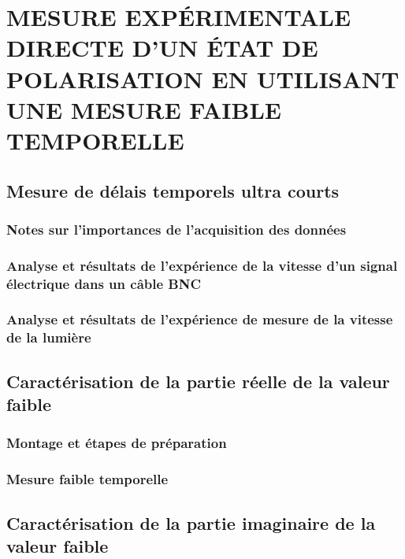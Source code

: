 \documentclass[superscriptaddress,12pt]{article}
\begin{document}
    \thispagestyle{empty}
    \section{MESURE EXPÉRIMENTALE DIRECTE D'UN ÉTAT DE POLARISATION EN UTILISANT UNE MESURE FAIBLE TEMPORELLE}\label{chap:3}
    
    \subsection{Mesure de délais temporels ultra courts}
    
    \subsubsection{Notes sur l'importances de l’acquisition des données	}
    
    \subsubsection{Analyse et résultats de l'expérience de la vitesse d'un signal électrique dans un câble BNC}
    
    \subsubsection{Analyse et résultats de l'expérience de mesure de la vitesse de la lumière}
    
    \subsection{Caractérisation de la partie réelle de la valeur faible}
    
    \subsubsection{Montage et étapes de préparation}
    
    \subsubsection{Mesure faible temporelle}
    
    \subsection{Caractérisation de la partie imaginaire de la valeur faible}
    
\end{document}
